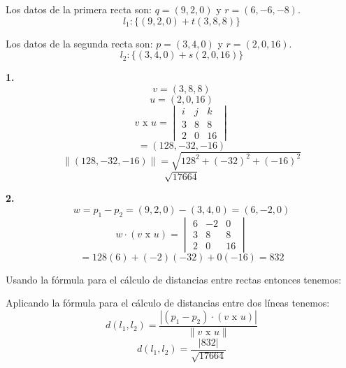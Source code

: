 \documentclass{article}
\begin{document}
Los datos de la primera recta son: $q = (9, 2, 0)$ y $r = (6, -6, -8)$.
$$l_1: \{(9,2,0)+t(3,8,8)\}$$


Los datos de la segunda recta son: $p = (3, 4, 0)$ y $r =(2, 0,16)$.
$$l_2: \{(3,4,0)+ s(2,0,16)\}$$


\begin{minipage}[c]{0.5cm}
   \textbf{1.}
   $$v = (3,8,8)$$
   $$u = (2,0,16)$$
   $$v \text{ x } u = \begin{vmatrix}
       i & j & k \\
       3 & 8 & 8\\
       2 & 0 & 16
   \end{vmatrix}$$
   $$=(128, -32, -16)$$
   $$\|(128, -32, -16)\| = \sqrt{128^2+ (-32)^2+(-16)^2}$$
   $$\sqrt{17664}$$
\end{minipage}\hspace*{7cm}\begin{minipage}[c]{0.5cm}
   \textbf{2.}
   $$w=p_1-p_2 =(9,2,0)-(3,4,0) =(6, -2, 0)$$
   $$w\cdot (v \text{ x } u) = \begin{vmatrix}
       6 & -2 & 0 \\
       3 & 8 & 8\\
       2 & 0 & 16
   \end{vmatrix}$$
   $$= 128(6)+(-2)(-32)+0(-16)= 832$$
\end{minipage}


Usando la fórmula para el cálculo de distancias entre rectas entonces tenemos:


Aplicando la fórmula para el cálculo de distancias entre dos líneas tenemos:
$$d(l_1,l_2) = \frac{\left|(p_1-p_2) \cdot(v \text{ x } u)\right|}{\|v \text{ x } u\|}$$
$$d(l_1,l_2) = \frac{\left|832\right|}{\sqrt{17664}}$$
\end{document}
